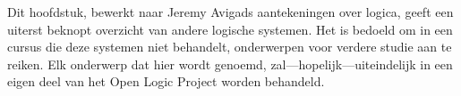 \documentclass[../../../include/open-logic-chapter]{subfiles}
\begin{document}

\begin{editorial}
  Dit hoofdstuk, bewerkt naar Jeremy Avigads aantekeningen over logica,
  geeft een uiterst beknopt overzicht van andere logische systemen. Het
  is bedoeld om in een cursus die deze systemen niet behandelt,
  onderwerpen voor verdere studie aan te reiken. Elk onderwerp dat
  hier wordt genoemd, zal---hopelijk---uiteindelijk in een eigen deel
  van het Open Logic Project worden behandeld.
\end{editorial}








\OLEndChapterHook
\end{document}
